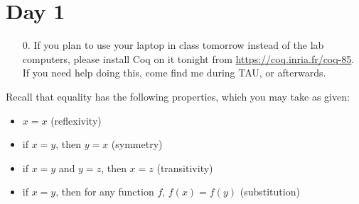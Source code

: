 \documentclass{article}
\begin{document}
\section*{Day 1}

\begin{enumerate}
  \item[0.]
    If you plan to use your laptop in class tomorrow instead of the lab computers, please install Coq on it tonight from \url{https://coq.inria.fr/coq-85}.  If you need help doing this, come find me during TAU, or afterwards.
\end{enumerate}

\noindent Recall that equality has the following properties, which you may take as given:
\begin{itemize}
  \item $x = x$ (reflexivity)
  \item if $x = y$, then $y = x$ (symmetry)
  \item if $x = y$ and $y = z$, then $x = z$ (transitivity)
  \item if $x = y$, then for any function $f$, $f(x) = f(y)$ (substitution)
\end{itemize}
\end{document}
